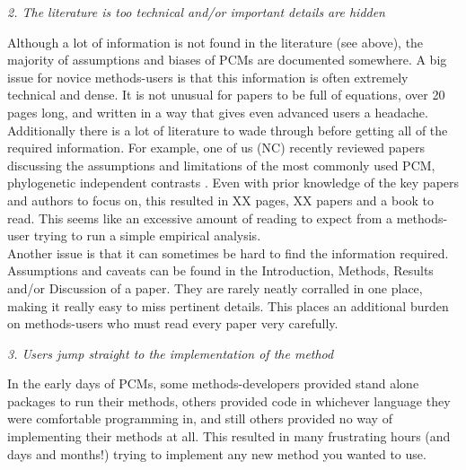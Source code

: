 \documentclass[a4paper,12pt]{article}
\renewcommand{\subsection}[1]{
  \bigskip
  \begin{center}
  \begin{large}
  \normalfont\itshape #1
  \end{large}
  \end{center}
}
\begin{document}
\subsection{2. The literature is too technical and/or important details are hidden}
Although a lot of information is not found in the literature (see above), the majority of assumptions and biases of PCMs are documented somewhere. 
A big issue for novice methods-users is that this information is often extremely technical and dense.
It is not unusual for papers to be full of equations, over 20 pages long, and written in a way that gives even advanced users a headache. 
Additionally there is a lot of literature to wade through before getting all of the required information. 
For example, one of us (NC) recently reviewed papers discussing the assumptions and limitations of the most commonly used PCM, phylogenetic independent contrasts \citep{felsenstein1985phylogenies}. 
Even with prior knowledge of the key papers and authors to focus on, this resulted in XX pages, XX papers and a book to read. %
This seems like an excessive amount of reading to expect from a methods-user trying to run a simple empirical analysis.\\

Another issue is that it can sometimes be hard to find the information required. Assumptions and caveats can be found in the Introduction, Methods, Results and/or Discussion of a paper. 
They are rarely neatly corralled in one place, making it really easy to miss pertinent details. 
This places an additional burden on methods-users who must read every paper very carefully.

\subsection{3. Users jump straight to the implementation of the method}
In the early days of PCMs, some methods-developers provided stand alone packages to run their methods, others provided code in whichever language they were comfortable programming in, and still others provided no way of implementing their methods at all. 
This resulted in many frustrating hours (and days and months!) trying to implement any new method you wanted to use.\\
\end{document}
